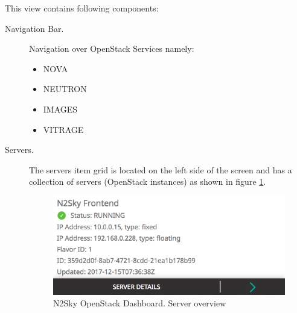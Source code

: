 This view contains following components:
\begin{description}
\item[Navigation Bar.] Navigation over OpenStack Services namely:
\begin{itemize}
\item NOVA
\item NEUTRON
\item IMAGES
\item VITRAGE
\end{itemize}
 
 \item[Servers.] The servers item grid is located on the left side of the screen and has a collection of servers (OpenStack instances) as shown in figure \ref{fig:openstack_servers}. 
 
 \begin{figure}[H]
\begin{center}
  \includegraphics[scale=0.5]{components/4/pics/openstack_servers.png}
  \caption{N2Sky OpenStack Dashboard. Server overview}
  \label{fig:openstack_servers}
\end{center}
\end{figure}


\end{description}
